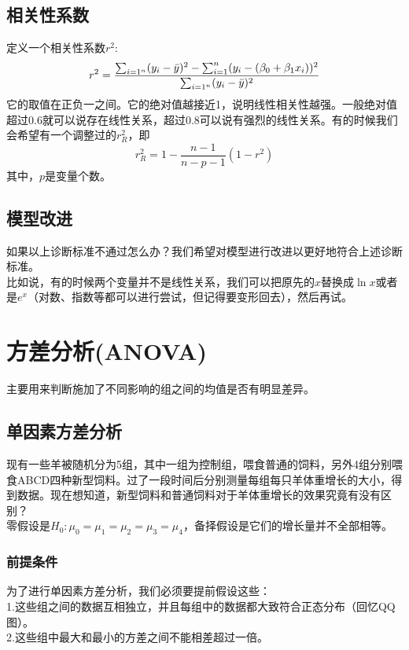 \documentclass[UTF8]{ctexbook}
\begin{document}
\section{相关性系数}
定义一个相关性系数$r^2$:
\[
r^2=\frac{\sum_{i=1^n}(y_i-\Bar{y})^2-\sum_{i=1}^n(y_i-(\beta_0+\beta_1x_i))^2}{\sum_{i=1^n}(y_i-\Bar{y})^2}
\]
它的取值在正负一之间。它的绝对值越接近1，说明线性相关性越强。一般绝对值超过0.6就可以说存在线性关系，超过0.8可以说有强烈的线性关系。有的时候我们会希望有一个调整过的$r^2_R$，即
\[
r^2_R=1-\frac{n-1}{n-p-1}(1-r^2)
\]
其中，$p$是变量个数。
\section{模型改进}
如果以上诊断标准不通过怎么办？我们希望对模型进行改进以更好地符合上述诊断标准。\\
\indent 比如说，有的时候两个变量并不是线性关系，我们可以把原先的$x$替换成$\ln{x}$或者是$e^x$（对数、指数等都可以进行尝试，但记得要变形回去），然后再试。
\chapter{方差分析(ANOVA)}
主要用来判断施加了不同影响的组之间的均值是否有明显差异。
\section{单因素方差分析}
现有一些羊被随机分为5组，其中一组为控制组，喂食普通的饲料，另外4组分别喂食ABCD四种新型饲料。过了一段时间后分别测量每组每只羊体重增长的大小，得到数据。现在想知道，新型饲料和普通饲料对于羊体重增长的效果究竟有没有区别？\\
\indent 零假设是$H_0: \mu_0=\mu_1=\mu_2=\mu_3=\mu_4$，备择假设是它们的增长量并不全部相等。
\subsection{前提条件}
为了进行单因素方差分析，我们必须要提前假设这些：\\
1.这些组之间的数据互相独立，并且每组中的数据都大致符合正态分布（回忆QQ图）。\\
2.这些组中最大和最小的方差之间不能相差超过一倍。\\
\end{document}
